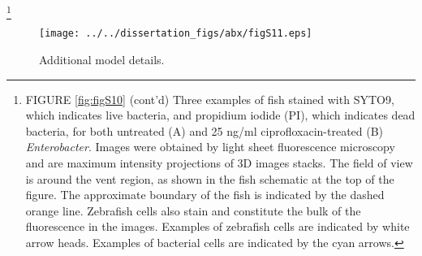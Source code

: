 {{{{{{\let\thefootnote\relax\footnote{FIGURE \ref{fig:figS10} (cont'd) Three examples of fish stained with SYTO9, which indicates live bacteria, and propidium iodide (PI), which indicates dead bacteria, for both untreated (A) and 25 ng/ml ciprofloxacin-treated (B) \textit{Enterobacter}. Images were obtained by light sheet fluorescence microscopy and are maximum intensity projections of 3D images stacks. The field of view is around the vent region, as shown in the fish schematic at the top of the figure. The approximate boundary of the fish is indicated by the dashed orange line. Zebrafish cells also stain and constitute the bulk of the fluorescence in the images. Examples of zebrafish cells are indicated by white arrow heads. Examples of bacterial cells are indicated by the cyan arrows.}
	

\begin{figure}[H]
	\centerline{
		\texttt{[image: ../../dissertation\_figs/abx/figS11.eps]}} 
	\caption{Additional model details.}
	\label{fig:figS11}
\end{figure}

}}}}}}
